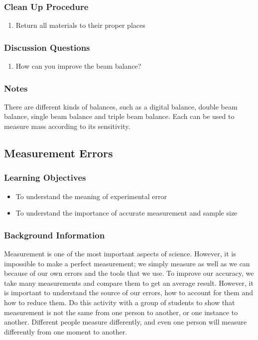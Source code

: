 \subsubsection*{Clean Up Procedure}
\begin{enumerate}
\item{Return all materials to their proper places}
\end{enumerate}

\subsubsection*{Discussion Questions}
\begin{enumerate}
\item{How can you improve the beam balance?}
\end{enumerate}

\subsubsection*{Notes}
There are different kinds of balances, such as a digital balance, double beam balance, single beam balance and triple beam balance.  Each can be used to measure mass according to its sensitivity.

\subsection{Measurement Errors}

\subsubsection*{Learning Objectives}
\begin{itemize}
\item{To understand the meaning of experimental error}
\item{To understand the importance of accurate measurement and sample size}
\end{itemize}

\subsubsection*{Background Information}
Measurement is one of the most important aspects of science.  However, it is impossible to make a perfect measurement; we simply measure as well as we can because of our own errors and the tools that we use.  To improve our accuracy, we take many measurements and compare them to get an average result.  However, it is important to understand the source of our errors, how to account for them and how to reduce them.
Do this activity with a group of students to show that measurement is not the same from one person to another, or one instance to another.  Different people measure differently, and even one person will measure differently from one moment to another.

